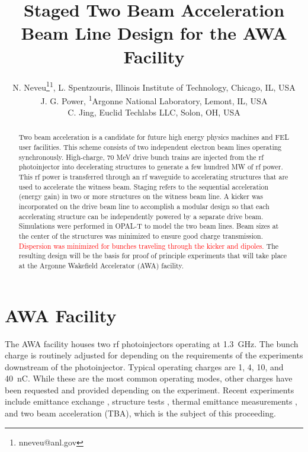 \documentclass[letterpaper,  %
              ]{jacow-2_3}   %
\begin{document}
\title{Staged Two Beam Acceleration Beam Line Design for the AWA Facility}

\author{N. Neveu\thanks{nneveu@anl.gov}\textsuperscript{1}, 
	    L. Spentzouris, Illinois Institute of Technology, Chicago, IL, USA \\
	    J. G. Power, \textsuperscript{1}Argonne National Laboratory, Lemont, IL, USA \\
	    C. Jing, Euclid Techlabs LLC, Solon, OH, USA}
\maketitle

%
\begin{abstract}
Two beam acceleration is a candidate for future high energy physics machines and FEL user facilities. 
This scheme consists of two independent electron beam lines operating synchronously. 
High-charge, 70 MeV drive bunch trains are injected from the rf photoinjector into
decelerating structures to generate a few hundred MW of rf power. 
This rf power is transferred through an rf waveguide to accelerating structures that are used to
accelerate the witness beam. Staging refers to the sequential acceleration (energy gain) 
in two or more structures on the witness beam line. A kicker was incorporated on the 
drive beam line to accomplish a modular design so that each accelerating structure 
can be independently powered by a separate drive beam. 
Simulations were performed in OPAL-T to model the two beam lines. 
Beam sizes at the center of the structures was minimized to ensure good charge transmission. 
\textcolor{red}{Dispersion was minimized for bunches traveling through the kicker and dipoles.} 
The resulting design will be the basis for proof of principle experiments that will take place 
at the Argonne Wakefield Accelerator (AWA) facility.
\end{abstract}


\section{AWA Facility}
The AWA facility houses two rf photoinjectors
operating at \SI{1.3}{GHz}. 
The bunch charge is routinely adjusted for depending on the requirements 
of the experiments downstream of the photoinjector.
Typical operating charges are 1, 4, 10, and \SI{40}{nC}. 
While these are the most
common operating modes, other charges have been requested 
and provided depending on the experiment.
Recent experiments include emittance exchange \cite{eex}, 
structure tests \cite{pets}, thermal emittance measurements \cite{therm}, 
and two beam acceleration \cite{tba} (TBA), which is the subject of this proceeding. 
\end{document}
